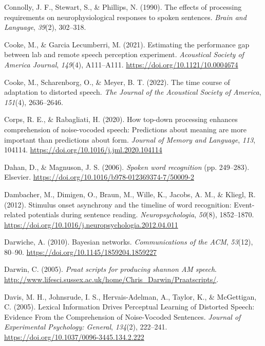 \documentclass[a4paper, nobind]{templates/ociamthesis}
\newlength{\cslhangindent}
\newenvironment{CSLReferences}[2] %
 {%
  \setlength{\parindent}{0pt}
  \ifodd #1
  \let\oldpar\par
  \def\par{\hangindent=\cslhangindent\oldpar}
  \fi
  \setlength{\parskip}{1mm}
  \setlength{\baselineskip}{6mm}
 }%
 {}
\begin{document}
\begin{CSLReferences}{1}{0}
\leavevmode{}%
Connolly, J. F., Stewart, S., \& Phillips, N. (1990). The effects of processing requirements on neurophysiological responses to spoken sentences. \emph{Brain and Language}, \emph{39}(2), 302--318.

\leavevmode{}%
Cooke, M., \& Garcia Lecumberri, M. (2021). Estimating the performance gap between lab and remote speech perception experiment. \emph{Acoustical Society of America Journal}, \emph{149}(4), A111--A111. \url{https://doi.org/10.1121/10.0004674}

\leavevmode{}%
Cooke, M., Scharenborg, O., \& Meyer, B. T. (2022). The time course of adaptation to distorted speech. \emph{The Journal of the Acoustical Society of America}, \emph{151}(4), 2636--2646.

\leavevmode{}%
Corps, R. E., \& Rabagliati, H. (2020). How top-down processing enhances comprehension of noise-vocoded speech: Predictions about meaning are more important than predictions about form. \emph{Journal of Memory and Language}, \emph{113}, 104114. \url{https://doi.org/10.1016/j.jml.2020.104114}

\leavevmode{}%
Dahan, D., \& Magnuson, J. S. (2006). \emph{Spoken word recognition} (pp. 249--283). Elsevier. \url{https://doi.org/10.1016/b978-012369374-7/50009-2}

\leavevmode{}%
Dambacher, M., Dimigen, O., Braun, M., Wille, K., Jacobs, A. M., \& Kliegl, R. (2012). {Stimulus onset asynchrony and the timeline of word recognition: Event-related potentials during sentence reading}. \emph{Neuropsychologia}, \emph{50}(8), 1852--1870. \url{https://doi.org/10.1016/j.neuropsychologia.2012.04.011}

\leavevmode{}%
Darwiche, A. (2010). Bayesian networks. \emph{Communications of the ACM}, \emph{53}(12), 80--90. \url{https://doi.org/10.1145/1859204.1859227}

\leavevmode{}%
Darwin, C. (2005). \emph{Praat scripts for producing shannon AM speech}. \url{http://www.lifesci.sussex.ac.uk/home/Chris_Darwin/Praatscripts/}.

\leavevmode{}%
Davis, M. H., Johnsrude, I. S., Hervais-Adelman, A., Taylor, K., \& McGettigan, C. (2005). Lexical Information Drives Perceptual Learning of Distorted Speech: Evidence From the Comprehension of Noise-Vocoded Sentences. \emph{Journal of Experimental Psychology: General}, \emph{134}(2), 222--241. \url{https://doi.org/10.1037/0096-3445.134.2.222}


\end{CSLReferences}
\end{document}
